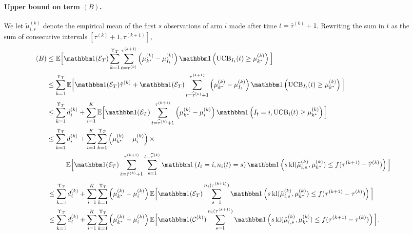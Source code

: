 \paragraph{Upper bound on term $(B)$.}
%
We let $\tilde{\mu}_{i,s}^{(k)}$ denote the empirical mean of the first $s$ observations of arm $i$ made after time $t=\hat{\tau}^{(k)}+1$. Rewriting the sum in $t$ as the sum of consecutive intervals $[\tau^{(k)}+1, \tau^{(k+1)}]$,
%
\begin{align*}
    (B) & \leq \bE\Big[\indic(\cE_T)\sum_{k=1}^{\Upsilon_T} \sum_{t=\tau^{(k)}}^{\tau^{(k+1)}}\left(\mu_{k^*}^{(k)} - \mu_{I_t}^{(k)}\right)\indic\left(\UCB_{I_t}(t) \geq \mu_{k^*}^{(k)}\right)\Big] \\
     & \leq \sum_{k=1}^{\Upsilon_T}\bE\Big[\indic(\cE_T)\hat{\tau}^{(k)} + \indic(\cE_T) \sum_{t=\widehat{\tau}^{(k)}+1}^{\tau^{(k+1)}}\left(\mu_{k^*}^{(k)} - \mu_{I_t}^{(k)}\right)\indic\left(\UCB_{I_t}(t) \geq \mu_{k^*}^{(k)}\right)\Big] \\
    & \leq \sum_{k=1}^{\Upsilon_T}d_i^{(k)}+ \sum_{i=1}^K \bE\Big[\indic(\cE_T) \sum_{t=\widehat{\tau}^{(k)}+1}^{\tau^{(k+1)}}\left(\mu_{k^*}^{(k)} - \mu_{i}^{(k)}\right)\indic\left(I_t=i,\UCB_{i}(t) \geq \mu_{k^*}^{(k)}\right)\Big] \\
    & \leq \sum_{k=1}^{\Upsilon_T}d_i^{(k)}+ \sum_{i=1}^K \sum_{k=1}^{\Upsilon_T}\left(\mu_{k^*}^{(k)} - \mu_{i}^{(k)}\right)\times \\
    &\hspace{1cm}\bE\Big[\indic(\cE_T) \sum_{t=\hat{\tau}^{(k)}+1}^{\tau^{(k+1)}}\sum_{s=1}^{t-\widehat{\tau}^{(k)}}\indic\left(I_t = i,n_i(t) = s\right) \indic\left(s \, \kl(\tilde{\mu}_{i,s}^{(k)}, \mu_{k^*}^{(k)}) \leq f(\tau^{(k+1)} - \widehat{\tau}^{(k)})\right)\Big]
\end{align*}%
\begin{align*}
    & \leq \sum_{k=1}^{\Upsilon_T}d_i^{(k)}+ \sum_{i=1}^K \sum_{k=1}^{\Upsilon_T}\left(\mu_{k^*}^{(k)} - \mu_{i}^{(k)}\right)\bE\Big[\indic(\cE_T) \sum_{s=1}^{n_i(\tau^{(k+1)})}\indic\left(s \, \kl(\tilde{\mu}_{i,s}^{(k)}, \mu_{k^*}^{(k)}) \leq f(\tau^{(k+1)} - \tau^{(k)})\right)\Big]  \\
    & \leq \sum_{k=1}^{\Upsilon_T}d_i^{(k)}+ \sum_{i=1}^K \sum_{k=1}^{\Upsilon_T}\left(\mu_{k^*}^{(k)} - \mu_{i}^{(k)}\right)\bE\Big[\indic(\cC^{(k)}) \sum_{s=1}^{n_i(\tau^{(k+1)})}\indic\left(s \, \kl(\tilde{\mu}_{i,s}^{(k)}, \mu_{k^*}^{(k)}) \leq f(\tau^{(k+1)} - \tau^{(k)})\right)\Big].
\end{align*}

